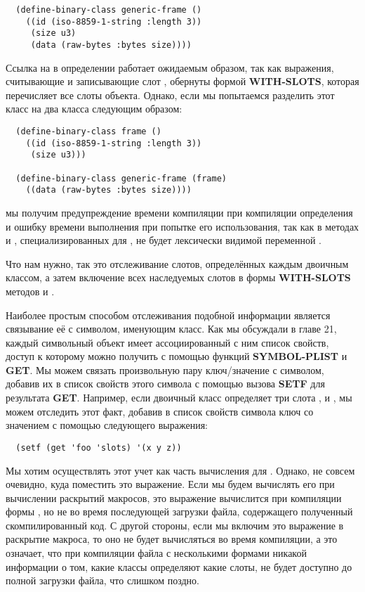 \begin{lstlisting}
  (define-binary-class generic-frame ()
    ((id (iso-8859-1-string :length 3))
     (size u3)
     (data (raw-bytes :bytes size))))
\end{lstlisting}

Ссылка на  в определении  работает ожидаемым образом, так как
выражения, считывающие и записывающие слот , обернуты формой
\textbf{WITH-SLOTS}, которая перечисляет все слоты объекта. Однако, если мы попытаемся
разделить этот класс на два класса следующим образом:

\begin{lstlisting}
  (define-binary-class frame ()
    ((id (iso-8859-1-string :length 3))
     (size u3)))

  (define-binary-class generic-frame (frame)
    ((data (raw-bytes :bytes size))))
\end{lstlisting}

мы получим предупреждение времени компиляции при компиляции определения
 и ошибку времени выполнения при попытке его использования, так как в
методах  и , специализированных для
, не будет лексически видимой переменной .

Что нам нужно, так это отслеживание слотов, определённых каждым двоичным классом, а затем
включение всех наследуемых слотов в формы \textbf{WITH-SLOTS} методов  и
.

Наиболее простым способом отслеживания подобной информации является связывание её с
символом, именующим класс. Как мы обсуждали в главе 21, каждый символьный объект имеет
ассоциированный с ним список свойств, доступ к которому можно получить с помощью функций
\textbf{SYMBOL-PLIST} и \textbf{GET}. Мы можем связать произвольную пару ключ/значение с
символом, добавив их в список свойств этого символа с помощью вызова \textbf{SETF} для
результата \textbf{GET}. Например, если двоичный класс  определяет три слота
,  и , мы можем отследить этот факт, добавив в список свойств
символа  ключ  со значением  с помощью следующего
выражения:

\begin{lstlisting}
  (setf (get 'foo 'slots) '(x y z))
\end{lstlisting}

Мы хотим осуществлять этот учет как часть вычисления  для
. Однако, не совсем очевидно, куда поместить это выражение. Если мы будем
вычислять его при вычислении раскрытий макросов, это выражение вычислится при компиляции
формы , но не во время последующей загрузки файла, содержащего
полученный скомпилированный код. С другой стороны, если мы включим это выражение в
раскрытие макроса, то оно не будет вычисляться во время компиляции, а это означает, что
при компиляции файла с несколькими формами  никакой информации о
том, какие классы определяют какие слоты, не будет доступно до полной загрузки файла, что
слишком поздно.

